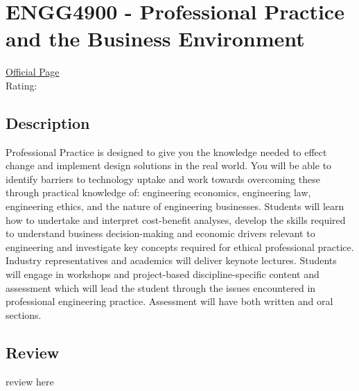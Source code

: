 \hypertarget{ENGG4900}{\section{ENGG4900 - Professional Practice and the Business Environment}}

\large
\textcolor{turbo_purple}{\href{https://my.uq.edu.au/programs-courses/course.html?course_code=ENGG4900}{Official Page}} \\
Rating: \cstar\cstar\cstar\cstar\ostar

\normalsize
\subsection*{Description}
Professional Practice is designed to give you the knowledge needed to effect change and implement design solutions in the real world.
You will be able to identify barriers to technology uptake and work towards overcoming these through practical knowledge of: engineering economics, engineering law, engineering ethics, and the nature of engineering businesses.
Students will learn how to undertake and interpret cost-benefit analyses, develop the skills required to understand business decision-making and economic drivers relevant to engineering and investigate key concepts required for ethical professional practice.
Industry representatives and academics will deliver keynote lectures.
Students will engage in workshops and project-based discipline-specific content and assessment which will lead the student through the issues encountered in professional engineering practice.
Assessment will have both written and oral sections.

\subsection*{Review}
review here
